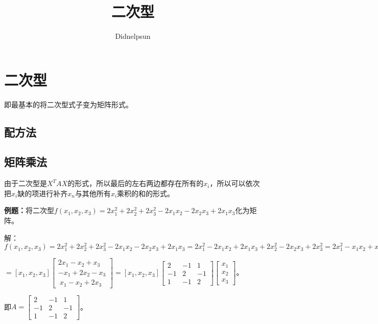 \documentclass[UTF8, 12pt]{ctexart}
\author{Didnelpsun}
\title{二次型}
\date{}
\begin{document}
\maketitle
\pagestyle{empty}
\thispagestyle{empty}
\tableofcontents
\thispagestyle{empty}
\newpage
\pagestyle{plain}
\setcounter{page}{1}
\section{二次型}

即最基本的将二次型式子变为矩阵形式。

\subsection{配方法}

\subsection{矩阵乘法}

由于二次型是$X^TAX$的形式，所以最后的左右两边都存在所有的$x_i$，所以可以依次把$x_i$缺的项进行补齐$x_n$与其他所有$x_i$乘积的和的形式。

\textbf{例题：}将二次型$f(x_1,x_2,x_3)=2x_1^2+2x_2^2+2x_3^2-2x_1x_2-2x_2x_3+2x_1x_3$化为矩阵。

解：$f(x_1,x_2,x_3)=2x_1^2+2x_2^2+2x_3^2-2x_1x_2-2x_2x_3+2x_1x_3=2x_1^2-2x_1x_2+2x_1x_3+2x_2^2-2x_2x_3+2x_3^2=2x_1^2-x_1x_2+x_1x_3+2x_2^2-x_1x_2-x_2x_3+2x_3^2+x_1x_3-x_2x_3=x_1(2x_1-x_2+x_3)+x_2(-x_1+2x_2-x_3)+x_3(x_1-x_2+2x_3)$

$=\left[x_1,x_2,x_3\right]\left[\begin{array}{c}
    2x_1-x_2+x_3 \\
    -x_1+2x_2-x_3 \\\
    x_1-x_2+2x_3
\end{array}\right]=[x_1,x_2,x_3]\left[\begin{array}{ccc}
    2 & -1 & 1\\
    -1 & 2 & -1\\
    1 & -1 & 2
\end{array}\right]\left[\begin{array}{c}
    x_1 \\
    x_2 \\
    x_3
\end{array}\right]$。

即$A=\left[\begin{array}{ccc}
    2 & -1 & 1\\
    -1 & 2 & -1\\
    1 & -1 & 2
\end{array}\right]$。
\end{document}
